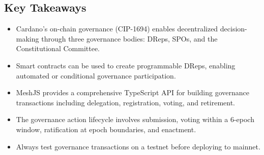 \subsection{Key Takeaways}

\begin{itemize}
    \item Cardano's on-chain governance (CIP-1694) enables decentralized decision-making through three governance bodies: DReps, SPOs, and the Constitutional Committee.
    \item Smart contracts can be used to create programmable DReps, enabling automated or conditional governance participation.
    \item MeshJS provides a comprehensive TypeScript API for building governance transactions including delegation, registration, voting, and retirement.
    \item The governance action lifecycle involves submission, voting within a 6-epoch window, ratification at epoch boundaries, and enactment.
    \item Always test governance transactions on a testnet before deploying to mainnet.
\end{itemize}
